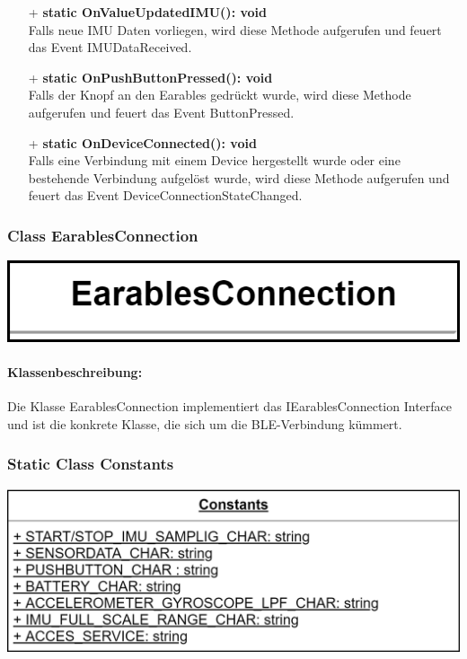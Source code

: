 \documentclass[a4paper,12pt]{article}
\begin{document}
\begin{itemize}
	\item[+] \textbf{static OnValueUpdatedIMU(): void}\\ Falls neue IMU Daten vorliegen, wird diese Methode aufgerufen und feuert das Event IMUDataReceived.
	\item[+] \textbf{static OnPushButtonPressed(): void}\\ Falls der Knopf an den \Gls{Earables} gedrückt wurde, wird diese Methode aufgerufen und feuert das Event ButtonPressed.
	\item[+] \textbf{static OnDeviceConnected(): void}\\ Falls eine Verbindung mit einem Device hergestellt wurde oder eine bestehende Verbindung aufgelöst wurde, wird diese Methode aufgerufen und feuert das Event DeviceConnectionStateChanged.
\end{itemize}

\begin{minipage}[t]{0.7\textwidth}
	\subsubsection{Class EarablesConnection}
\end{minipage}
\begin{minipage}[c]{0.3\textwidth}
	\includegraphics[width=\textwidth]{bilder/BibPackageKlassen/EarablesConnection}
\end{minipage}

\paragraph{Klassenbeschreibung:}
Die Klasse EarablesConnection implementiert das IEarablesConnection Interface und ist die konkrete Klasse, die sich um die BLE-Verbindung kümmert.\\

\begin{minipage}[b]{0.5\textwidth}
	\subsubsection{Static Class Constants}
	
	\end{minipage}
	\begin{minipage}[c]{0.5\textwidth}
	\includegraphics[width=\textwidth]{bilder/BibPackageKlassen/Constants.png}
\end{minipage}
\end{document}

